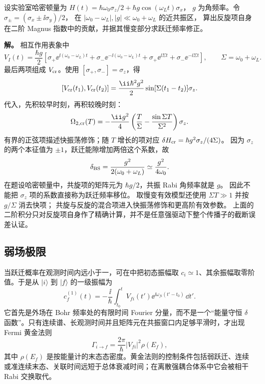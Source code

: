 \begin{workedexample}
设实验室哈密顿量为
$H(t)=\hbar\omega_0\sigma_z/2+\hbar g\cos(\omega_Lt)\sigma_x$，
$g$ 为角频率。令 $\sigma_\pm=(\sigma_x\pm\ii\sigma_y)/2$，
在 $|\omega_0-\omega_L|,|g|\ll\omega_0+\omega_L$ 的近共振区，
算出反旋项自身在二阶 Magnus 指数中的贡献，并据其慢变部分求跃迁频率修正。

\textbf{解。} 相互作用表象中
\[
V_I(t)=\frac{\hbar g}{2}\left[
\sigma_+\ee^{\ii(\omega_0-\omega_L)t}
+\sigma_-\ee^{-\ii(\omega_0-\omega_L)t}
+\sigma_+\ee^{\ii\Sigma t}+\sigma_-\ee^{-\ii\Sigma t}\right],
\qquad \Sigma=\omega_0+\omega_L.
\]
最后两项组成 $V_{\rm cr}$。使用 $[\sigma_+,\sigma_-]=\sigma_z$，得
\[
[V_{\rm cr}(t_1),V_{\rm cr}(t_2)]
=\frac{\ii\hbar^2g^2}{2}\sin[\Sigma(t_1-t_2)]\sigma_z.
\]
代入，先积较早时刻，再积较晚时刻：
\[
\Omega_{2,\rm cr}(T)=-\frac{\ii g^2}{4}
\left(\frac{T}{\Sigma}-\frac{\sin\Sigma T}{\Sigma^2}\right)\sigma_z.
\]
有界的正弦项描述快振荡修饰；随 $T$ 增长的项对应
$\delta H_{\rm cr}=\hbar g^2\sigma_z/(4\Sigma)$。
因为 $\sigma_z$ 的两个本征值为 $\pm1$，跃迁能隙增加两倍这个系数，故
\[
\delta_{\rm BS}=\frac{g^2}{2(\omega_0+\omega_L)}
\simeq\frac{g^2}{4\omega_0}.
\]
在题设哈密顿量中，共旋项的矩阵元为 $\hbar g/2$，共振 Rabi 角频率就是 $g$。
因此不能把 $\sigma_z$ 项的系数直接称为跃迁频率移位。
取慢变有效模型还使用 $\Sigma T\gg1$ 并按 $g/\Sigma$ 消去快项；
共旋与反旋的混合项进入快振荡修饰和更高阶有效参数。
上面的二阶积分只对反旋项自身作了精确计算，并不是任意强驱动下整个传播子的截断误差认证。
\end{workedexample}


\subsection{弱场极限}

当跃迁概率在观测时间内远小于一，可在中把初态振幅取 $c_i\simeq1$、其余振幅取零阶值。于是从 $|i\rangle$ 到 $|f\rangle$ 的一级振幅为
\begin{equation}
c_f^{(1)}(t)
=-\frac{\ii}{\hbar}\int_{t_0}^{t}
V_{fi}(t')\ee^{\ii\omega_{fi}(t'-t_0)}\,\dd t'.
\label{eq:first-order-transition-amplitude}
\end{equation}
它首先是外场在 Bohr 频率处的有限时间 Fourier 分量，而不是一个“能量守恒 \(\delta\) 函数”。只有连续谱、长观测时间并且矩阵元在共振窗口内足够平滑时，才出现 Fermi 黄金法则
\begin{equation}
\Gamma_{i\to f}
=\frac{2\pi}{\hbar}|V_{fi}|^2\rho(E_f),
\label{eq:fermi-golden-rule}
\end{equation}
其中 $\rho(E_f)$ 是按能量计的末态态密度。黄金法则的控制条件包括弱跃迁、连续或准连续末态、关联时间远短于总体衰减时间；在离散强耦合体系中它会被相干 Rabi 交换取代。


